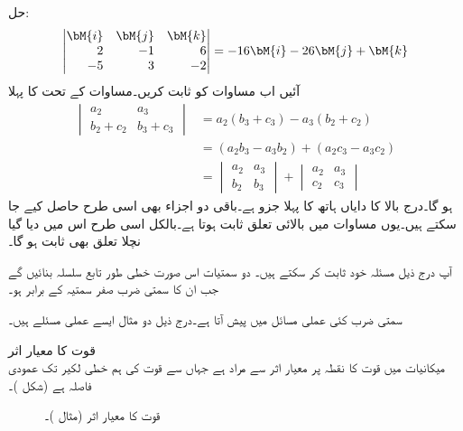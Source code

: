 حل:
\begin{align*}
\begin{vmatrix*}[r]\bM{i}&\bM{j}&\bM{k}\\2&-1&6\\-5&3&-2  \end{vmatrix*}=-16\bM{i}-26\bM{j}+\bM{k}
\end{align*}
آئیں اب مساوات  کو ثابت کریں۔مساوات  کے تحت  کا پہلا
\begin{align*}
\begin{vmatrix}a_2&a_3\\b_2+c_2&b_3+c_3 \end{vmatrix}&=a_2(b_3+c_3)-a_3(b_2+c_2)\\
&=(a_2b_3-a_3b_2)+(a_2c_3-a_3c_2)\\
&=\begin{vmatrix} a_2&a_3\\b_2&b_3 \end{vmatrix}+\begin{vmatrix}a_2&a_3\\c_2&c_3  \end{vmatrix}
\end{align*}
ہو گا۔درج بالا کا دایاں ہاتھ   کا پہلا جزو ہے۔باقی دو اجزاء بھی اسی طرح حاصل کیے جا سکتے ہیں۔یوں  مساوات  میں بالائی تعلق ثابت ہوتا ہے۔بالکل اسی طرح اس میں دیا گیا نچلا تعلق بھی ثابت ہو گا۔ 

آپ درج ذیل مسئلہ خود ثابت کر سکتے ہیں۔
دو سمتیات اس صورت خطی طور تابع سلسلہ بنائیں گے جب ان کا سمتی ضرب صفر سمتیہ کے برابر ہو۔

سمتی ضرب کئی عملی مسائل میں پیش آتا ہے۔درج ذیل دو مثال ایسے عملی مسئلے ہیں۔

\quad قوت کا معیار اثر\\
میکانیات میں قوت  کا نقطہ  پر  معیار اثر  سے مراد  ہے  جہاں  سے قوت کی ہم خطی لکیر  تک عمودی فاصلہ  ہے (شکل )۔
\begin{figure}
\centering
{}
\caption{قوت کا معیار اثر (مثال )۔}
\label{شکل_مثال_الجبرا_قوت_معیار_اثر}
\end{figure}

